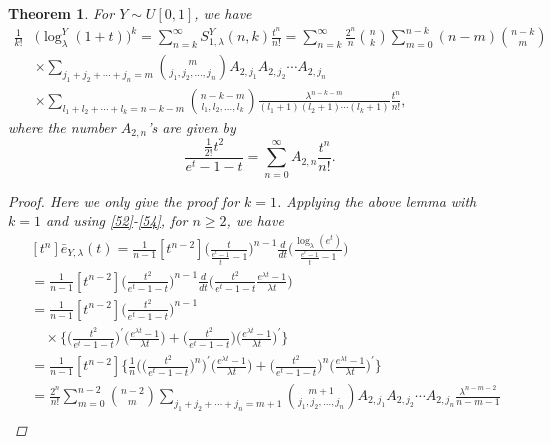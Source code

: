 \documentclass[a4paper,11pt]{amsart}
\newtheorem{theorem}{Theorem}[section]
\begin{document}
\begin{theorem}
For $Y \sim U[0,1]$, we have
\begin{equation} \label{55}
\begin{aligned}
\frac{1}{k!}&\big(\log_{\lambda}^{Y}(1+t)\big)^{k}=\sum_{n=k}^{\infty}S_{1,\lambda}^{Y}(n,k)\frac{t^{n}}{n!}=\sum_{n=k}^{\infty}\frac{2^{n}}{n}\binom{n}{k}\sum_{m=0}^{n-k}(n-m)\binom{n-k}{m}\\
& \times \sum_{j_1+j_2+\cdots+j_n=m}\binom{m}{j_1,j_2,\dots,j_n}A_{2,j_1}A_{2,j_2}\cdots A_{2,j_n} \\
&\times \sum_{l_1+l_2+\cdots+l_k=n-k-m}\binom{n-k-m}{l_1,l_2,\dots,l_k}\frac{\lambda^{n-k-m}}{(l_1+1)(l_2+1)\cdots(l_k+1)}\frac{t^{n}}{n!},
\end{aligned}
\end{equation}
where the number $A_{2,n}$'s are given by
\begin{equation*}
\frac{\frac{1}{2!}t^{2}}{e^{t}-1-t}=\sum_{n=0}^{\infty}A_{2,n}\frac{t^{n}}{n!}.
\end{equation*}
\begin{proof}
Here we only give the proof for $k=1$. Applying the above lemma with $k=1$ and using \eqref{52}-\eqref{54}, for $n \ge 2$, we have
\begin{equation} \label{56}
\begin{aligned}
&[t^{n}]\bar{e}_{Y,\lambda}(t)=\frac{1}{n-1}[t^{n-2}]\bigg(\frac{t}{\frac{e^{t}-1}{t}-1}\bigg)^{n-1}\frac{d}{dt}\bigg(\frac{\log_{\lambda}(e^{t})}{\frac{e^{t}-1}{t}-1} \bigg)\\
&=\frac{1}{n-1}[t^{n-2}]\bigg(\frac{t^{2}}{e^{t}-1-t}\bigg)^{n-1} \frac{d}{dt}\bigg(\frac{t^{2}}{e^{t}-1-t}\frac{e^{\lambda t}-1}{\lambda t}\bigg) \\
&=\frac{1}{n-1}[t^{n-2}]\bigg(\frac{t^{2}}{e^{t}-1-t}\bigg)^{n-1}\\
&\quad\times\bigg\{\bigg(\frac{t^{2}}{e^{t}-1-t}\bigg)^{\prime}\bigg(\frac{e^{\lambda t}-1}{\lambda t}\bigg)+\bigg(\frac{t^{2}}{e^{t}-1-t}\bigg)\bigg(\frac{e^{\lambda t}-1}{\lambda t}\bigg)^{\prime}\bigg\}\\
&=\frac{1}{n-1}[t^{n-2}]\bigg\{ \frac{1}{n}\bigg(\bigg(\frac{t^{2}}{e^{t}-1-t}\bigg)^{n}\bigg)^{\prime}\bigg(\frac{e^{\lambda t}-1}{\lambda t}\bigg)+\bigg(\frac{t^{2}}{e^{t}-1-t}\bigg)^{n}\bigg(\frac{e^{\lambda t}-1}{\lambda t}\bigg)^{\prime} \bigg\} \\
&=\frac{2^{n}}{n!}\sum_{m=0}^{n-2}\binom{n-2}{m}\sum_{j_1+j_2+\cdots+j_n=m+1}\binom{m+1}{j_1,j_2,\dots,j_n}A_{2,j_1}A_{2,j_2}\cdots A_{2,j_n}\frac{\lambda^{n-m-2}}{n-m-1} \\

\end{aligned}
\end{equation}
\end{proof}
\end{theorem}
\end{document}
